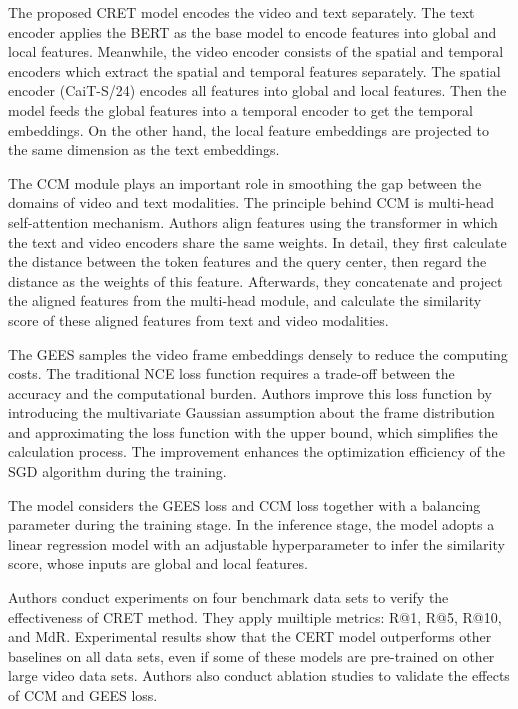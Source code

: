 \documentclass{article}
\begin{document}
The proposed CRET model encodes the video and text separately.  The text encoder applies the BERT as the base model to encode features into global and local features. Meanwhile, the video encoder consists of the spatial and temporal encoders which extract the spatial and temporal features separately. The spatial encoder (CaiT-S/24) encodes all features into global and local features. Then the model feeds the global features into a temporal encoder to get the temporal embeddings. On the other hand, the local feature embeddings are projected to the same dimension as the text embeddings.

The CCM module plays an important role in smoothing the gap between the domains of video and text modalities. The principle behind CCM is multi-head self-attention mechanism. Authors align features using the transformer in which the text and video encoders share the same weights. In detail, they first calculate the distance between the token features and the query center, then regard the distance as the weights of this feature. Afterwards, they concatenate and project the aligned features from the multi-head module, and calculate the similarity score of these aligned features from text and video modalities.

The GEES samples the video frame embeddings densely to reduce the computing costs. The traditional NCE loss function requires a trade-off between the accuracy and the computational burden. Authors improve this loss function by introducing the multivariate Gaussian assumption about the frame distribution and approximating the loss function with the upper bound, which simplifies the calculation process. The improvement enhances the optimization efficiency of the SGD algorithm during the training.

The model considers the GEES loss and CCM loss together with a balancing parameter during the training stage. In the inference stage, the model adopts a linear regression model with an adjustable hyperparameter to infer the similarity score, whose inputs are global and local features.

Authors conduct experiments on four benchmark data sets to verify the effectiveness of CRET method. They apply muiltiple metrics: R@1, R@5, R@10, and MdR. Experimental results show that the CERT model outperforms other baselines on all data sets, even if some of these models are pre-trained on other large video data sets. Authors also conduct ablation studies to validate the effects of CCM and GEES loss.
\end{document}
